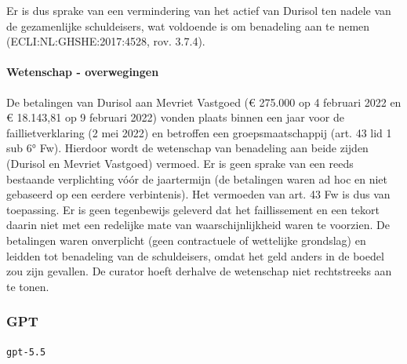 \documentclass[
  dutch,
  a4paper,
]{article}
\begin{document}
Er is dus sprake van een vermindering van het actief van Durisol ten nadele van de gezamenlijke schuldeisers, wat voldoende is om benadeling aan te nemen (ECLI:NL:GHSHE:2017:4528, rov. 3.7.4).

\paragraph{Wetenschap - overwegingen}\label{wetenschap---overwegingen-12}

De betalingen van Durisol aan Mevriet Vastgoed (€ 275.000 op 4 februari 2022 en € 18.143,81 op 9 februari 2022) vonden plaats binnen een jaar voor de faillietverklaring (2 mei 2022) en betroffen een groepsmaatschappij (art. 43 lid 1 sub 6° Fw). Hierdoor wordt de wetenschap van benadeling aan beide zijden (Durisol en Mevriet Vastgoed) vermoed. Er is geen sprake van een reeds bestaande verplichting vóór de jaartermijn (de betalingen waren ad hoc en niet gebaseerd op een eerdere verbintenis). Het vermoeden van art. 43 Fw is dus van toepassing. Er is geen tegenbewijs geleverd dat het faillissement en een tekort daarin niet met een redelijke mate van waarschijnlijkheid waren te voorzien. De betalingen waren onverplicht (geen contractuele of wettelijke grondslag) en leidden tot benadeling van de schuldeisers, omdat het geld anders in de boedel zou zijn gevallen. De curator hoeft derhalve de wetenschap niet rechtstreeks aan te tonen.

\newpage


\subsubsection{GPT}\label{gpt-4}

\texttt{gpt-5.5}
\end{document}
